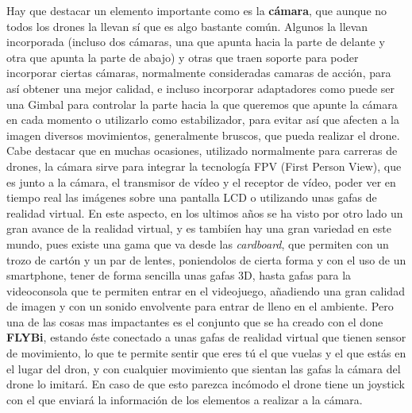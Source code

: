 \hspace{1 cm} Hay que destacar un elemento importante como es la \textbf{c\'amara}, que aunque no todos los drones la llevan s\'i que es algo bastante com\'un. Algunos la llevan incorporada (incluso dos c\'amaras, una que apunta hacia la parte de delante y otra que apunta la parte de abajo) y otras que traen soporte para poder incorporar ciertas c\'amaras, normalmente consideradas camaras de acci\'on, para as\'i obtener una mejor calidad, e incluso incorporar adaptadores como puede ser una Gimbal para controlar la parte hacia la que queremos que apunte la c\'amara en cada momento o utilizarlo como estabilizador, para evitar as\'i que afecten a la imagen diversos movimientos, generalmente bruscos, que pueda realizar el drone. Cabe destacar que en muchas ocasiones, utilizado normalmente para carreras de drones, la c\'amara sirve para integrar la tecnolog\'ia FPV (First Person View), que es junto a la c\'amara, el transmisor de v\'ideo y el receptor de v\'ideo, poder ver en tiempo real las im\'agenes sobre una pantalla LCD o utilizando unas gafas de realidad virtual. En este aspecto, en los ultimos años se ha visto por otro lado un gran avance de la realidad virtual, y es tambi\'ien hay una gran variedad en este mundo, pues existe una gama que va desde las \emph{cardboard}, que permiten con un trozo de cart\'on y un par de lentes, poniendolos de cierta forma y con el uso de un smartphone, tener de forma sencilla unas gafas 3D, hasta gafas para la videoconsola que te permiten entrar en el videojuego, añadiendo una gran calidad de imagen y con un sonido envolvente para entrar de lleno en el ambiente. Pero una de las cosas mas impactantes es el conjunto que se ha creado con el done \textbf{FLYBi}, estando \'este conectado a unas gafas de realidad virtual que tienen sensor de movimiento, lo que te permite sentir que eres t\'u el que vuelas y el que est\'as en el lugar del dron, y con cualquier movimiento que sientan las gafas la c\'amara del drone lo imitar\'a. En caso de que esto parezca inc\'omodo el drone tiene un joystick con el que enviar\'a la informaci\'on de los elementos a realizar a la c\'amara. 
 

